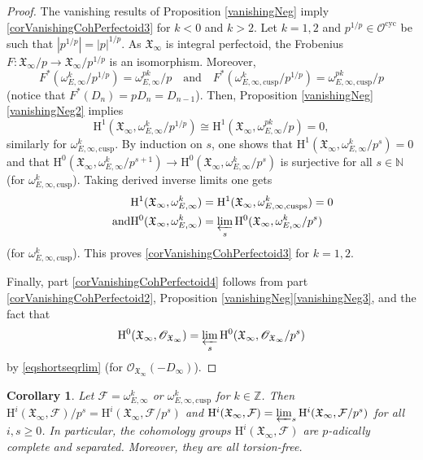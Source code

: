 \documentclass[JEP,XML,SOM,Unicode,published]{cedram}
\newcommand{\quand}{\quad\text{and}\quad}
\newcommand{\cusp}{\mathrm{cusp}}
\newcommand{\cusps}{\mathrm{cusps}}
\newcommand{\cyc}{\mathrm{cyc}}
\numberwithin{equation}{section}
\newtheorem{cor}[prop]{Corollary}
\theoremstyle{definition}
\newcommand{\bb}[1]{\mathbb{#1}}
\newcommand{\n}[1]{\mathcal{#1}}
\newcommand{\f}[1]{\mathfrak{#1}}
\newcommand{\s}[1]{\mathscr{#1}}
\begin{document}
\begin{proof}
The vanishing results of Proposition \ref{vanishingNeg} imply \eqref{corVanishingCohPerfectoid3} for $k<0$ and $k>2$. Let $k=1,2$ and $p^{1/p}\in \n{O}^{\cyc}$ be such that $|p^{1/p}|=|p|^{1/p}$. As $\f{X}_{\infty}$ is integral perfectoid, the Frobenius $F:\f{X}_{\infty}/p\to \f{X}_{\infty}/p^{1/p}$ is an isomorphism. Moreover,
\[
F^*(\omega_{E,\infty}^{k}/p^{1/p})=\omega_{E,\infty}^{pk}/p\quand F^*(\omega_{E,\infty,\cusp}^k/p^{1/p})=\omega_{E,\infty,\cusp}^{pk}/p
\]
(notice that $F^*(D_n)=pD_n= D_{n-1}$). Then, Proposition \ref{vanishingNeg}\eqref{vanishingNeg2} implies
\begin{equation}
\label{vanishingperfint}
\mathrm{H}^1(\f{X}_{\infty}, \omega^k_{E,\infty}/p^{1/p})\cong \mathrm{H}^1(\f{X}_{\infty}, \omega^{pk}_{E,\infty}/p)=0,
\end{equation}
similarly for $\omega^{k}_{E,\infty,\cusp}$. By induction on $s$, one shows that $\mathrm{H}^1(\f{X}_{\infty}, \omega_{E,\infty}^k/p^s)=0$ and that $\mathrm{H}^0(\f{X}_{\infty}, \omega^k_{E,\infty}/p^{s+1})\to \mathrm{H}^0(\f{X}_{\infty}, \omega^k_{E,\infty}/p^s)$ is surjective for all $s\in \bb{N}$ (\resp for $\omega_{E,\infty,\cusp}^{k}$). Taking derived inverse limits one gets
\begin{align*}
\mathrm{H}^1(\f{X}_{\infty}, \omega_{E,\infty}^k)&=\mathrm{H}^1(\f{X}_{\infty}, \omega_{E,\infty,\cusps}^k)=0\\
\tag*{and}
\mathrm{H}^0(\f{X}_{\infty}, \omega^k_{E,\infty})&= \varprojlim_s \mathrm{H}^0(\f{X}_{\infty}, \omega^k_{E,\infty}/p^s)
\end{align*}
(\resp for $\omega^k_{E,\infty, \cusp}$). This proves \eqref{corVanishingCohPerfectoid3} for $k=1,2$.

Finally, part \eqref{corVanishingCohPerfectoid4} follows from part \eqref{corVanishingCohPerfectoid2}, Proposition \ref{vanishingNeg}\eqref{vanishingNeg3}, and the fact that
\[\mathrm{H}^0(\f{X}_{\infty}, \s{O}_{\f{X}_\infty})= \varprojlim_s \mathrm{H}^0(\f{X}_{\infty}, \s{O}_{\f{X}_\infty}/p^s)\]
by \eqref{eqshortseqrlim} (\resp for $\s{O}_{\f{X}_{\infty}}(-D_{\infty})$).
\end{proof}

\begin{cor}
\label{CoroHiTorsionfree}
Let $\n{F}=\omega^k_{E,\infty}$ or $\omega^k_{E,\infty,\cusp}$ for $k\in \bb{Z}$. Then $\mathrm{H}^i(\f{X}_{\infty}, \n{F})/p^s= \mathrm{H}^i(\f{X}_{\infty}, \n{F}/p^s)$ and $ \mathrm{H}^i(\f{X}_{\infty}, \n{F})=\varprojlim_s \mathrm{H}^i(\f{X}_{\infty}, \n{F} /p^s)$ for all $i,s\geq 0$. In particular, the cohomology groups $ \mathrm{H}^i(\f{X}_{\infty}, \n{F})$ are $p$-adically complete and separated. Moreover, they are all torsion-free.
\end{cor}
\end{document}
